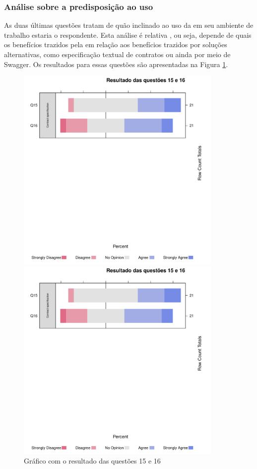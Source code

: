 \subsubsection{Análise sobre a predisposição ao uso}

As duas últimas questões tratam de quão inclinado ao uso da \neoidl{} em seu
ambiente de trabalho estaria o respondente.
Esta análise é relativa \cite{laitenberger1998evaluating}, ou seja, depende de
quais os benefícios trazidos pela \neoidl{} em relação aos benefícios trazidos por soluções alternativas, como
especificação textual de contratos ou ainda por meio de Swagger. Os resultados
para essas questões são apresentadas na Figura \ref{Respostas15e16}.

\begin{figure}[!htb]
\centering
\includegraphics[width=100mm,trim = 6mm 115mm 6mm 
10mm,clip]{img/GraficoResultadoQuestoes15e16.pdf}

\includegraphics[width=100mm,trim = 6mm 0mm 6mm 
170mm,clip]{img/GraficoResultadoQuestoes15e16.pdf}

\caption{Gráfico com o resultado das questões 15 e 16}
\label{Respostas15e16}
\end{figure}

